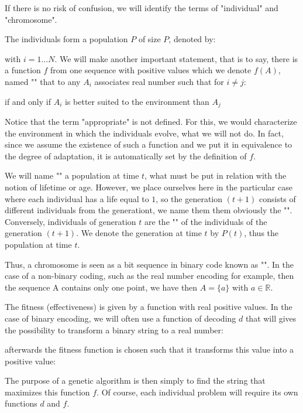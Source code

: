 	If there is no risk of confusion, we will identify the terms of "individual" and "chromosome".

	The individuals form a population $P$ of size $P$, denoted by:
	
	with $i=1\ldots N$.
	We will make another important statement, that is to say, there is a function $f$ from one sequence with positive values which we denote $f(A)$, named "" that to any $A_i$ associates real number such that for $i\neq j$:
	
	if and only if $A_i$ is better suited to the environment than $A_j$

	Notice that the term "appropriate" is not defined. For this, we would characterize the environment in which the individuals evolve, what we will not do. In fact, since we assume the existence of such a function and we put it in equivalence to the degree of adaptation, it is automatically set by the definition of $f$.

	We will name "" a population at time $t$, what must be put in relation with the notion of lifetime or age. However, we place ourselves here in the particular case where each individual has a life equal to $1$, so the generation $(t + 1)$ consists of different individuals from the generation$ $t, we name them them obviously the "". Conversely, individuals of generation $t$ are the "" of the individuals of the generation $(t + 1)$. We denote the generation at time $t$ by $P(t)$, thus the population at time $t$.

	Thus, a chromosome is seen as a bit sequence in binary code known as "". In the case of a non-binary coding, such as the real number encoding for example, then the sequence A contains only one point, we have then $A=\{a\}$ with $a\in\mathbb{R}$. 
	
	\begin{tcolorbox}[title=Remark,colframe=black,arc=10pt]
	The fitness (effectiveness) is given by a function with real positive values. In the case of binary encoding, we will often use a function of decoding $d$ that will gives the possibility to transform  a binary string to a real number:
	
	afterwards the fitness function is chosen such that it transforms this value into a positive value:
	
	\end{tcolorbox}	
	The purpose of a genetic algorithm is then simply to find the string that maximizes this function $f$. Of course, each individual problem will require its own functions $d$ and $f$.

